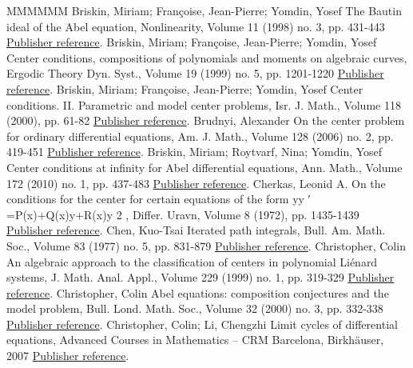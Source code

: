 \documentclass[11pt]{article}
\theoremstyle{definition}
\numberwithin{equation}{section}
\numberwithin{figure}{section}
\numberwithin{table}{section}
\begin{document}
\begin{thebibliography}{MMMMMM}
 Briskin, Miriam; Françoise, Jean-Pierre; Yomdin, Yosef The Bautin ideal of the Abel equation, Nonlinearity, Volume 11 (1998) no. 3, pp. 431-443 \href{https://ahl.centre-mersenne.org/item/AHL_2020__3__615_0/#bfy98}{Publisher reference}.
 Briskin, Miriam; Françoise, Jean-Pierre; Yomdin, Yosef Center conditions, compositions of polynomials and moments on algebraic curves, Ergodic Theory Dyn. Syst., Volume 19 (1999) no. 5, pp. 1201-1220 \href{https://ahl.centre-mersenne.org/item/AHL_2020__3__615_0/#bfy99}{Publisher reference}.
 Briskin, Miriam; Françoise, Jean-Pierre; Yomdin, Yosef Center conditions. II. Parametric and model center problems, Isr. J. Math., Volume 118 (2000), pp. 61-82 \href{https://ahl.centre-mersenne.org/item/AHL_2020__3__615_0/#bfy00}{Publisher reference}.
 Brudnyi, Alexander On the center problem for ordinary differential equations, Am. J. Math., Volume 128 (2006) no. 2, pp. 419-451 \href{https://ahl.centre-mersenne.org/item/AHL_2020__3__615_0/#brud06}{Publisher reference}.
 Briskin, Miriam; Roytvarf, Nina; Yomdin, Yosef Center conditions at infinity for Abel differential equations, Ann. Math., Volume 172 (2010) no. 1, pp. 437-483 \href{https://ahl.centre-mersenne.org/item/AHL_2020__3__615_0/#bry10}{Publisher reference}.
 Cherkas, Leonid A. On the conditions for the center for certain equations of the form yy ′ =P(x)+Q(x)y+R(x)y 2 , Differ. Uravn, Volume 8 (1972), pp. 1435-1439 \href{https://ahl.centre-mersenne.org/item/AHL_2020__3__615_0/#cher72}{Publisher reference}.
 Chen, Kuo-Tsai Iterated path integrals, Bull. Am. Math. Soc., Volume 83 (1977) no. 5, pp. 831-879 \href{https://ahl.centre-mersenne.org/item/AHL_2020__3__615_0/#chen77}{Publisher reference}.
 Christopher, Colin An algebraic approach to the classification of centers in polynomial Liénard systems, J. Math. Anal. Appl., Volume 229 (1999) no. 1, pp. 319-329 \href{https://ahl.centre-mersenne.org/item/AHL_2020__3__615_0/#chri99}{Publisher reference}.
 Christopher, Colin Abel equations: composition conjectures and the model problem, Bull. Lond. Math. Soc., Volume 32 (2000) no. 3, pp. 332-338 \href{https://ahl.centre-mersenne.org/item/AHL_2020__3__615_0/#chri00}{Publisher reference}.
 Christopher, Colin; Li, Chengzhi Limit cycles of differential equations, Advanced Courses in Mathematics – CRM Barcelona, Birkhäuser, 2007 \href{https://ahl.centre-mersenne.org/item/AHL_2020__3__615_0/#chri07}{Publisher reference}.

\end{thebibliography}
\end{document}
